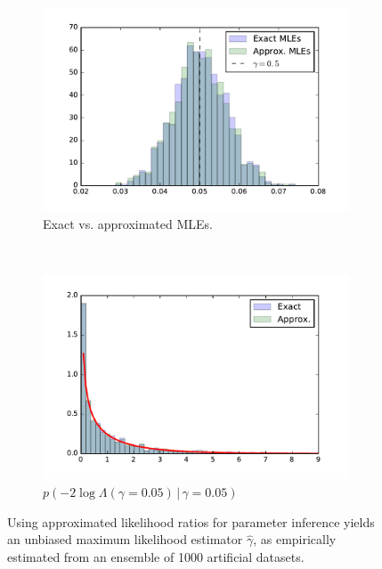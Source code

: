 \documentclass[12pt]{article}
\numberwithin{equation}{section}
\theoremstyle{plain}
\begin{document}
\begin{figure}
    \centering

    \begin{subfigure}[t]{0.475\textwidth}
        \includegraphics[clip, trim=0.5cm 0.5cm 0.5cm 0.5cm,width=\textwidth]{figures/fig2a.pdf}
        \caption{Exact vs. approximated MLEs.}
        \label{fig:2a}
    \end{subfigure}
    ~ %
    \begin{subfigure}[t]{0.475\textwidth}
        \includegraphics[clip, trim=0.5cm 0.5cm 0.5cm 0.5cm,width=\textwidth]{figures/fig2b.pdf}
        \caption{$p(-2 \log \Lambda(\gamma=0.05) \, | \, \gamma=0.05)$}
        \label{fig:2b}
    \end{subfigure}

    \caption{Using approximated likelihood ratios for parameter inference yields an unbiased maximum likelihood estimator
            $\hat \gamma$, as empirically estimated from an ensemble of 1000 artificial datasets.}
    \label{fig:2}
\end{figure}
\end{document}
